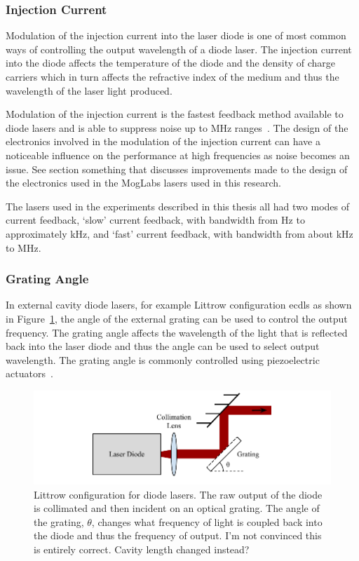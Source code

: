 \subsubsection{Injection Current}
Modulation of the injection current into the laser diode is one of most common ways of controlling the output wavelength of a diode laser.
The injection current into the diode affects the temperature of the diode and the density of charge carriers which in turn affects the refractive index of the medium and thus the wavelength of the laser light produced.

Modulation of the injection current is the fastest feedback method available to diode lasers and is able to suppress noise up to \unit{MHz} ranges~\cite{ludlow_compact_2007,torrance_sub-kilohertz_2016}.
The design of the electronics involved in the modulation of the injection current can have a noticeable influence on the performance at high frequencies as noise becomes an issue.
{\color{red}See section something that discusses improvements made to the design of the electronics used in the MogLabs lasers used in this research.}

The lasers used in the experiments described in this thesis all had two modes of current feedback, `slow' current feedback, with bandwidth from \unit[0]{Hz} to approximately \unit[100]{kHz}, and `fast' current feedback, with bandwidth from about \unit[100]{kHz} to \unit[50]{MHz}.


\subsubsection{Grating Angle}
In external cavity diode lasers, for example Littrow configuration \glspl{ecdl} as shown in Figure~\ref{figure:littrow}, the angle of the external grating can be used to control the output frequency.
The grating angle affects the wavelength of the light that is reflected back into the laser diode and thus the angle can be used to select output wavelength.
The grating angle is commonly controlled using piezoelectric actuators~\cite{hawthorn_littrow_2001}.

\begin{figure}
\includegraphics{part1/Figs/LittrowConfiguration.pdf}
\caption{Littrow configuration for diode lasers. The raw output of the diode is collimated and then incident on an optical grating. The angle of the grating, $\theta$, changes what frequency of light is coupled back into the diode and thus the frequency of output.
{\color{red}I'm not convinced this is entirely correct. Cavity length changed instead?}}
\label{figure:littrow}
\end{figure}

